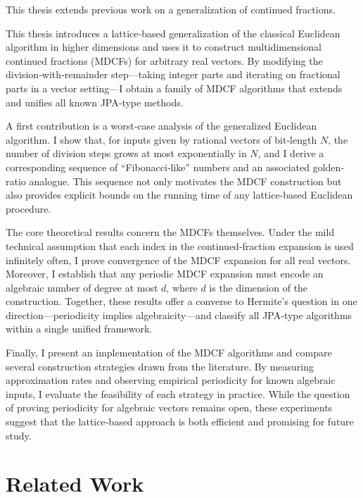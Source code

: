 This thesis extends previous work on a generalization of continued fractions.

This thesis introduces a lattice‐based generalization of the classical Euclidean
algorithm in higher dimensions and uses it to construct multidimensional continued
fractions (MDCFs) for arbitrary real vectors.  By modifying the division‐with‐remainder
step—taking integer parts and iterating on fractional parts in a vector setting—I
obtain a family of MDCF algorithms that extends and unifies all known JPA‐type methods.

A first contribution is a worst‐case analysis of the generalized Euclidean algorithm.
I show that, for inputs given by rational vectors of bit‐length $N$, the number of
division steps grows at most exponentially in $N$, and I derive a corresponding
sequence of “Fibonacci‐like” numbers and an associated golden‐ratio analogue.  This
sequence not only motivates the MDCF construction but also provides explicit bounds
on the running time of any lattice‐based Euclidean procedure.

The core theoretical results concern the MDCFs themselves.  Under the mild technical
assumption that each index in the continued‐fraction expansion is used infinitely
often, I prove convergence of the MDCF expansion for all real vectors.  Moreover,
I establish that any periodic MDCF expansion must encode an algebraic number of
degree at most $d$, where $d$ is the dimension of the construction.  Together,
these results offer a converse to Hermite’s question in one direction—periodicity
implies algebraicity—and classify all JPA‐type algorithms within a single unified
framework.

Finally, I present an implementation of the MDCF algorithms and compare several
construction strategies drawn from the literature.  By measuring approximation
rates and observing empirical periodicity for known algebraic inputs, I evaluate
the feasibility of each strategy in practice.  While the question of proving
periodicity for algebraic vectors remains open, these experiments suggest that
the lattice‐based approach is both efficient and promising for future study.

\section{Related Work}

